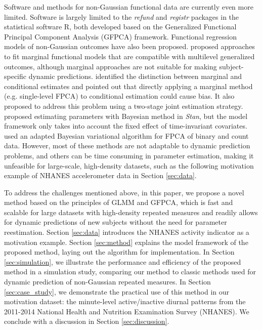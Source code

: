 \documentclass[12pt]{article}
\begin{document}
Software and methods for non-Gaussian functional data are currently even more limited. Software is largely limited to the \emph{refund} \citep{refundpkg} and \emph{registr} \cite{Wrobel2018}
packages in the statistical software R, both developed based on the Generalized Functional Principal Component Analysis (GFPCA) framework. Functional
regression models of non-Gaussian outcomes have also been proposed. \citet{chen2013} proposed approaches to fit
marginal functional models that are compatible with multilevel generalized outcomes, although marginal approaches are not suitable for making subject-specific dynamic predictions. \citet{gertheiss2017} identified the distinction between marginal and conditional estimates and pointed out that directly applying a marginal method (e.g. single-level FPCA) to conditional estimation could cause bias. It also proposed to address this problem using a two-stage joint estimation strategy. \citet{goldsmith2015} proposed estimating parameters with Bayesian method in \emph{Stan}, but the model
framework only takes into account the fixed effect of time-invariant
covariates. \citet{linde2019} used an adapted Bayesian
variational algorithm for FPCA of binary and count data. However, most of these methods are not adaptable to dynamic prediction problems, and others can be time consuming in parameter estimation, making it unfeasible for large-scale, high-density datasets, such as the following motivation example of NHANES accelerometer data in Section \ref{sec:data}.

To address the challenges mentioned above, in this paper, we propose a novel method based on the principles of GLMM and GFPCA, which is fast and scalable for large datasets with high-density repeated measures and readily allows for dynamic predictions of new subjects without the need for parameter reestimation. Section \ref{sec:data} introduces the NHANES activity indicator as a motivation example. Section \ref{sec:method} explains the model framework of the proposed method, laying out the algorithm for implementation. In Section \ref{sec:simulation}, we illustrate the performance and efficiency of the proposed method in a simulation study, comparing our method to classic methods used for dynamic prediction of non-Gaussian repeated measures. In Section \ref{sec:case_study},
we demonstrate the practical use of this method in our motivation dataset: the minute-level active/inactive diurnal patterns from the 2011-2014 National Health and Nutrition Examination Survey (NHANES). We conclude with a discussion in Section \ref{sec:discussion}. 
\end{document}
